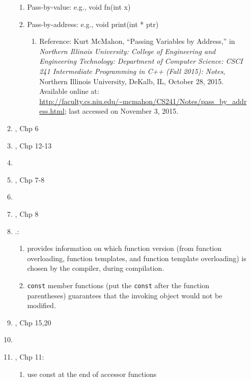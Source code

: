 \begin{enumerate}
\begin{enumerate}
\begin{enumerate}
		\item Pass-by-value: e.g., void fn(int x)
		\item Pass-by-address: e.g., void print(int * ptr) \vspace{-0.1cm}
			\begin{enumerate} \itemsep -1pt
			\item Reference: Kurt McMahon, ``Passing Variables by Address,'' in {\it Northern Illinois University: College of Engineering and Engineering Technology: Department of Computer Science: CSCI 241 Intermediate Programming in C++ (Fall 2015): Notes}, Northern Illinois University, DeKalb, IL, October 28, 2015. Available online at: \url{http://faculty.cs.niu.edu/~mcmahon/CS241/Notes/pass_by_address.html}; last accessed on November 3, 2015.
			\end{enumerate}
		\end{enumerate}
	\item \cite{Lippman2013}, Chp 6
	\item \cite{Allain2012}, Chp 12-13
	\item \cite[Chp. 5, pp. 193--248; Chp. 7, pp. 307--349]{Horstmann2012}
	\item \cite{Prata2012}, Chp 7-8
	\item \cite[Chp. 4--5; \S11.1; and Chp. 14]{Savitch2009}
	\item \cite{Stroustrup2009}, Chp 8
	\item \cite[Chp. 7--8, pp. 279--391]{Prata2005}.: \vspace{-0.2cm}
		\begin{enumerate} \itemsep -2pt
		\item \cite[pp. 382--383]{Prata2005} provides information on which function version (from function overloading, function templates, and function template overloading) is chosen by the compiler, during compilation.
		\item {\tt const} member functions (put the {\tt const} after the function parentheses) guarantees that the invoking object would not be modified.
		\end{enumerate}
	\item \cite{Oualline2003}, Chp 15,20
	\item \cite[Chp. 6--8, pp. 105--179]{Schildt2003a}
	\item \cite{Eckel2000}, Chp 11: \vspace{-0.2cm}
		\begin{enumerate} \itemsep -2pt
		\item use const at the end of accessor functions

\end{enumerate}
\end{enumerate}
\end{enumerate}
